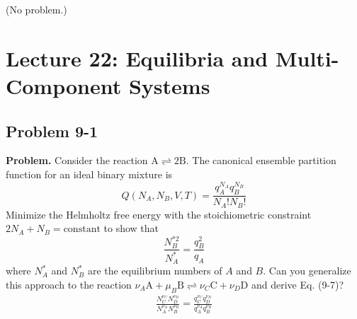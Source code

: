 \documentclass[twocolumn, 10pt]{article}
\numberwithin{equation}{section}
\newenvironment{problem}
{\par\medskip \color{problue}
  \textbf{Problem. }\ignorespaces}
{\medskip}
\begin{document}
(No problem.)

\section{Lecture 22: Equilibria and Multi-Component Systems}

\subsection{Problem 9-1}

\begin{problem}
  Consider the reaction
  $\mathrm{A} \rightleftharpoons 2\mathrm{B}$.
  The canonical ensemble partition function for an ideal binary mixture is
  $$
  Q(N_A, N_B, V, T)
  =
  \frac{ q_A^{N_A} q_B^{N_B} }
  { N_A! N_B! }
  $$
  Minimize the Helmholtz free energy with the stoichiometric constraint
  $2N_A + N_B = \mathrm{constant}$
  to show that
  \begin{equation}
    \frac{ N_B^{*2} } { N_A^* }
    =
    \frac{ q_B^2 } { q_A }
    \label{eq:NBNA}
  \end{equation}
  where $N_A^*$ and $N_B^*$ are the equilibrium numbers of $A$ and $B$.
  Can you generalize this approach to the reaction
  $\nu_A \mathrm{A} + \mu_B \mathrm{B} \rightleftharpoons \nu_C \mathrm{C} + \nu_D \mathrm{D}$
  and derive Eq. (9-7)?
  \begin{align}
    \frac{ N_C^{\nu_C} N_D^{\nu_D} }
         { N_A^{\nu_A} N_B^{\nu_B} }
    =
    \frac{ q_C^{\nu_C} q_D^{\nu_D} }
         { q_A^{\nu_A} q_B^{\nu_B} }
    \tag{9-7}
    \label{eq:chemeqABCD}
  \end{align}
\end{problem}
\end{document}
